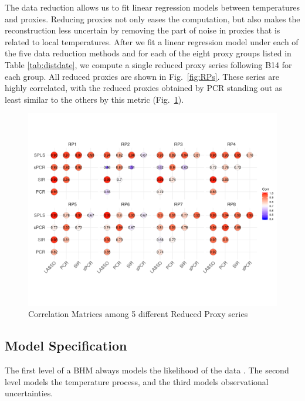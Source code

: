 \documentclass[12pt]{amsart}
\theoremstyle{plain}
\theoremstyle{definition}
\theoremstyle{remark}
\begin{document}
The data reduction allows us to fit linear regression models between
temperatures and proxies. Reducing proxies not only eases the computation, but
also makes the reconstruction less uncertain by removing the part of noise in
proxies that is related to local temperatures. After we fit a linear regression model under each of
the five data reduction methods and for each of the eight proxy groups listed in
Table \ref{tab:distdate}, we compute a single reduced proxy series following
B14 for each group. All reduced proxies are shown in Fig.~\ref{fig:RPs}.  These series are highly correlated, with the reduced proxies obtained by PCR standing out as least similar to the others by this metric (Fig.~\ref{fig:CorrRPs}).

\begin{figure}[h!]
  \vskip -1cm
  \centering
 \includegraphics[scale=0.35]{CorMatrixRPs} 
  \vskip -1.1cm \caption{Correlation Matrices among 5 different Reduced Proxy series}
  \label{fig:CorrRPs}
\end{figure}


\subsection{Model Specification}
\label{sec:modelspec}
 The first level of a BHM always models the likelihood of the data \citep{Tingley_QSR2012}. The second level models the temperature process, and the third models observational uncertainties. 
 
\end{document}
